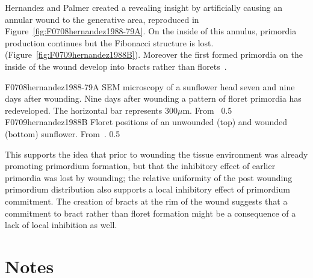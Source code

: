 

Hernandez and Palmer created a  revealing insight by artificially causing an annular wound to the generative area, reproduced in Figure~\ref{fig:F0708hernandez1988-79A}\autocite{hernandezRegenerationSunflowerCapitulum1988}. On the inside of this annulus, primordia production continues but the Fibonacci structure is lost. (Figure~\ref{fig:F0709hernandez1988B}). Moreover the first formed primordia on the inside of the wound develop into bracts rather than florets~\autocite{hernandezRegenerationSunflowerCapitulum1988}.%

\jpgfig%
{F0708hernandez1988-79A}%
{
	SEM microscopy of a sunflower head seven and nine days after wounding. Nine days after wounding a pattern of floret primordia has redeveloped. 
	The horizontal bar represents $300\mu${}m. 
	From~\autocite{hernandezRegenerationSunflowerCapitulum1988}
}%
{0.5}%
\jpgfig%
{F0709hernandez1988B}%
{Floret positions of an unwounded (top) and wounded (bottom) sunflower. From~\autocite{hernandezRegenerationSunflowerCapitulum1988}.}%
{0.5}%


This supports the idea that prior to wounding the tissue environment was already promoting primordium formation, but that the inhibitory effect of earlier primordia was lost by wounding; the relative uniformity of the post wounding primordium distribution also supports a local inhibitory effect of primordium commitment. The creation of bracts at the rim of the wound suggests that a commitment to bract rather than floret formation might be a consequence of a lack of local inhibition as well. 

  
\section{Notes}
